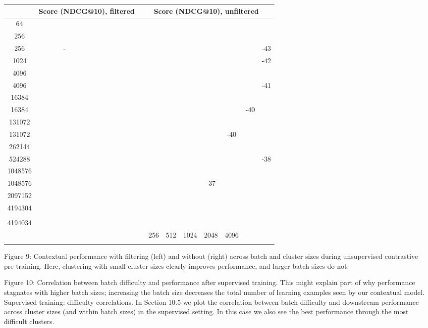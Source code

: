 \begin{tabular}{|c|c|c|c|c|c|c|c|c|c|l|}
\hline & \multicolumn{2}{|c|}{ Score (NDCG@10), filtered } & \multicolumn{8}{|c|}{ Score (NDCG@10), unfiltered } \\
\hline 64 & & & & & & & & & & \\
\hline 256 & & & & & & & & & & \\
\hline 256 & - & & & & & & & & & -43 \\
\hline 1024 & & & & & & & & & & -42 \\
\hline 4096 & & & & & & & & & & \\
\hline 4096 & & & & & & & & & & -41 \\
\hline 16384 & & & & & & & & & & \\
\hline 16384 & & & & & & & & & -40 \\
\hline 131072 & & & & & & & & & & \\
\hline 131072 & & & & & & & & -40 \\
\hline 262144 & & & & & & & & & & \\
\hline 524288 & & & & & & & & & & -38 \\
\hline 1048576 & & & & & & & & & & \\
\hline 1048576 & & & & & & & -37 \\
\hline 2097152 & & & & & & & & & & \\
\hline 4194304 & & & & & & & & & & \\
\hline & & & & & & & & & & \\
\hline 4194034 & & & & & & & & & & \\
\hline & & & & 256 & 512 & 1024 & 2048 & 4096 & \\
\hline & & & & & & & & & & \\
\hline
\end{tabular}
Figure 9: Contextual performance with filtering (left) and without (right) across batch and cluster sizes during unsupervised contrastive pre-training. Here, clustering with small cluster sizes clearly improves performance, and larger batch sizes do not.

Figure 10: Correlation between batch difficulty and performance after supervised training.
This might explain part of why performance stagnates with higher batch sizes; increasing the batch size decreases the total number of learning examples seen by our contextual model.
Supervised training: difficulty correlations. In Section 10.5 we plot the correlation between batch difficulty and downstream performance across cluster sizes (and within batch sizes) in the supervised setting. In this case we also see the best performance through the most difficult clusters.

